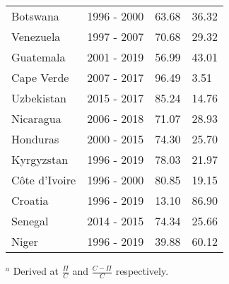 \begin{table}[pos = H]
{{\begin{tabular}{llll}
Botswana & 1996 - 2000 & 63.68 & 36.32\\
Venezuela & 1997 - 2007 & 70.68 & 29.32\\
Guatemala & 2001 - 2019 & 56.99 & 43.01\\
\addlinespace
Cape Verde & 2007 - 2017 & 96.49 & 3.51\\
Uzbekistan & 2015 - 2017 & 85.24 & 14.76\\
Nicaragua & 2006 - 2018 & 71.07 & 28.93\\
Honduras & 2000 - 2015 & 74.30 & 25.70\\
Kyrgyzstan & 1996 - 2019 & 78.03 & 21.97\\
\addlinespace
Côte d’Ivoire & 1996 - 2000 & 80.85 & 19.15\\
Croatia & 1996 - 2019 & 13.10 & 86.90\\
Senegal & 2014 - 2015 & 74.34 & 25.66\\
Niger & 1996 - 2019 & 39.88 & 60.12\\
\bottomrule \end{tabular}
    }
}
\raggedright{\footnotesize \(^a\) Derived at \(\frac{\Pi}{C}\) and \(\frac{C-\Pi}{C}\) respectively.}
\label{tbl-shares_table}
\end{table}
